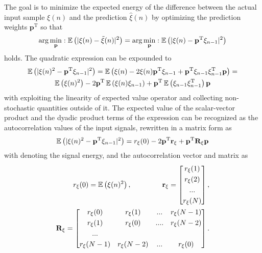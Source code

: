 The goal is to minimize the expected energy of the difference between the actual input sample $\xi(n)$ and the prediction $\hat{\xi}(n)$ by optimizing the prediction weights $\mathbf{p}^{\mathrm{T}}$ so that 
\begin{equation}
\arg\min\limits_{\mathbf{p}}: \operatorname{\mathbb{E}}\left( | \xi(n) - \tilde{\xi}(n) |^2 \right) = \arg\min\limits_{\mathbf{p}}: \operatorname{\mathbb{E}}\left( | \xi(n) - \mathbf{p}^{\mathrm{T}} \mathbf{\xi}_{n-1} |^2 \right) 
\end{equation}
holds.
The quadratic expression can be expounded to
\begin{multline}
\operatorname{\mathbb{E}}\left( | \xi(n)^2 - \mathbf{p}^{\mathrm{T}} \mathbf{\xi}_{n-1} |^2 \right) =
\operatorname{\mathbb{E}}\left( \xi(n) - 2\xi(n)\mathbf{p}^{\mathrm{T}} \mathbf{\xi}_{n-1}  + \mathbf{p}^{\mathrm{T}} \mathbf{\xi}_{n-1}  \mathbf{\xi}_{n-1}^{\mathrm{T}} \mathbf{p}\right) = \\
\operatorname{\mathbb{E}}\left( \xi(n)^2 \right) - 2 \mathbf{p}^{\mathrm{T}} \operatorname{\mathbb{E}}\left(  \xi(n) \mathbf{\xi}_{n-1} \right) + \mathbf{p}^{\mathrm{T}} \operatorname{\mathbb{E}}\left(  \mathbf{\xi}_{n-1}  \mathbf{\xi}_{n-1}^{\mathrm{T}} \right) \mathbf{p}
\end{multline}
with exploiting the linearity of expected value operator and collecting non-stochastic quantities outside of it.
The expected value of the scalar-vector product and the dyadic product terms of the expression can be recognized as the autocorrelation values of the input signals, rewritten in a matrix form as
\begin{equation}
\operatorname{\mathbb{E}}\left( | \xi(n)^2 - \mathbf{p}^{\mathrm{T}} \mathbf{\xi}_{n-1} |^2 \right) =
r_{\xi}(0) - 2 \mathbf{p}^{\mathrm{T}} \mathbf{r}_{\xi} + \mathbf{p}^{\mathrm{T}} \mathbf{R}_\xi \mathbf{p}
\label{Eq:quad_eq}
\end{equation}
with denoting the signal energy, and the autocorrelation vector and matrix as
\begin{align}
\begin{split}
r_{\xi}(0) = \EX\left( \xi(n)^2 \right), \hspace{15mm}
\mathbf{r}_{\xi} =  \begin{bmatrix}
       r_\xi(1) \\[0.3em]
       r_\xi(2) \\[0.3em]
       ... \\[0.3em]
       r_\xi(N) \end{bmatrix}, \\
\mathbf{R}_{\xi} =  \begin{bmatrix}
       r_\xi(0) & r_\xi(1) & ... & r_\xi(N-1) \\[0.3em]
       r_\xi(1) & r_\xi(0) & .... & r_\xi(N-2)\\[0.3em]
       ... \\[0.3em]
       r_\xi(N-1) & r_\xi(N-2) & ... & r_\xi(0)\end{bmatrix}.
\end{split}
\end{align}
